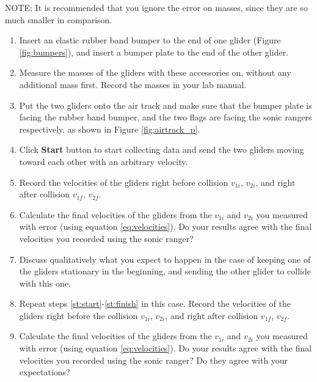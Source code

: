 NOTE:  It is recommended that you ignore the error on masses, since they are so much smaller in comparison.

\begin{enumerate}
\item Insert an elastic rubber band bumper to the end of one glider (Figure \ref{fig:bumpers}), and insert a bumper plate to the end of the other glider.
\item Measure the masses of the gliders with these accessories on, without any additional mass first. Record the masses in your lab manual.
\item Put the two gliders onto the air track and make sure that the bumper plate is facing the rubber band bumper, and the two flags are facing the sonic rangers respectively, as shown in Figure \ref{fig:airtrack_p}.\label{st:start}
\item Click \textbf{Start} button to start collecting data and send the two gliders moving toward each other with an arbitrary velocity.
\item Record the velocities of the gliders right before collision $v_{1i}$, $v_{2i}$, and right after collision $v_{1f}$, $v_{2f}$.
\item Calculate the final velocities of the gliders from the $v_{1i}$ and $v_{2i}$ you measured with error (using equation \ref{eq:velocities}). Do your results agree with the final velocities you recorded using the sonic ranger?  \label{st:finish}

  \item Discuss qualitatively what you expect to happen in the case of keeping one of the gliders stationary in the beginning, and sending the other glider to collide with this one.
  \item Repeat steps \ref{st:start}-\ref{st:finish} in this case. Record the velocities of the gliders right before the collision $v_{1i}$, $v_{2i}$, and right after collision $v_{1f}$, $v_{2f}$.
  \item Calculate the final velocities of the gliders from the $v_{1i}$ and $v_{2i}$ you measured with error (using equation \ref{eq:velocities}). Do your results agree with the final velocities you recorded using the sonic ranger? Do they agree with your expectations?


\end{enumerate}
